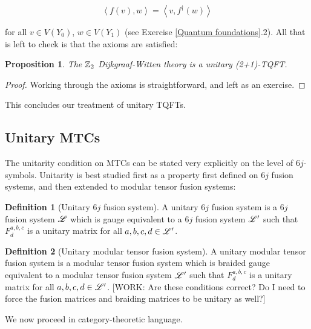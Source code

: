 \documentclass{article}
\newtheorem{proposition}{Proposition}[section]
\theoremstyle{definition}
\newtheorem*{definition}{Definition}
\numberwithin{figure}{section}
\begin{document}
$$\left<f(v),w\right>=\left<v,f^{\dagger}(w)\right>$$

for all $v\in V(Y_0)$, $w\in V(Y_1)$ (see Exercise \ref{Quantum foundations}.2). All that is left to check is that the axioms are satisfied:

\begin{proposition} The $\mathbb{Z}_2$ Dijkgraaf-Witten theory is a unitary (2+1)-TQFT.
\end{proposition}
\begin{proof} Working through the axioms is straightforward, and left as an exercise.
\end{proof}

This concludes our treatment of unitary TQFTs.

\subsection{Unitary MTCs}

The unitarity condition on MTCs can be stated very explicitly on the level of $6j$-symbols. Unitarity is best studied first as a property first defined on $6j$ fusion systems, and then extended to modular tensor fusion systems:

\begin{definition}[Unitary $6j$ fusion system] A unitary $6j$ fusion system is a $6j$ fusion system $\mathscr{L}$ which is gauge equivalent to a $6j$ fusion system $\mathscr{L}'$ such that $F^{a,b,c}_{d}$ is a unitary matrix for all $a,b,c,d\in \mathscr{L}'$.

\raggedleft\qedsymbol{}
\end{definition}

\begin{definition}[Unitary modular tensor fusion system] A unitary modular tensor fusion system is a modular tensor fusion system which is braided gauge equivalent to a modular tensor fusion system $\mathscr{L}'$ such that $F^{a,b,c}_{d}$ is a unitary matrix for all $a,b,c,d\in\mathscr{L}'$. [WORK: Are these conditions correct? Do I need to force the fusion matrices and braiding matrices to be unitary as well?]

\raggedleft\qedsymbol{}
\end{definition}

We now proceed in category-theoretic language.
\end{document}
